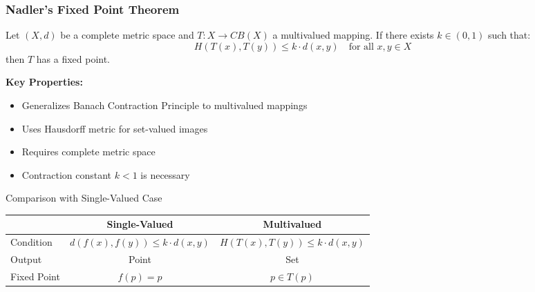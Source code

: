 \documentclass[aspectratio=169,10pt]{beamer}
\begin{document}
\begin{frame}
\frametitle{Nadler's Fixed Point Theorem}

\begin{theorem}[Nadler Jr., 1969]
Let $(X,d)$ be a complete metric space and $T: X \to CB(X)$ a multivalued mapping.
If there exists $k \in (0,1)$ such that:
\[
H(T(x), T(y)) \leq k \cdot d(x,y) \quad \text{for all } x,y \in X
\]
then $T$ has a fixed point.
\end{theorem}

\vspace{0.3cm}

\textbf{Key Properties:}
\begin{itemize}
    \item Generalizes Banach Contraction Principle to multivalued mappings
    \item Uses Hausdorff metric for set-valued images
    \item Requires complete metric space
    \item Contraction constant $k < 1$ is necessary
\end{itemize}

\vspace{0.2cm}

\begin{block}{Comparison with Single-Valued Case}
\begin{center}
\begin{tabular}{|l|c|c|}
\hline
& Single-Valued & Multivalued \\
\hline
Condition & $d(f(x), f(y)) \leq k \cdot d(x,y)$ & $H(T(x), T(y)) \leq k \cdot d(x,y)$ \\
Output & Point & Set \\
Fixed Point & $f(p) = p$ & $p \in T(p)$ \\
\hline
\end{tabular}
\end{center}
\end{block}

\end{frame}
\end{document}
